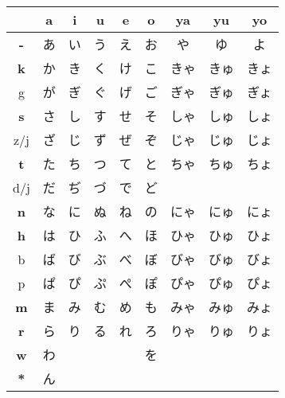 

\begin{center}

\begin{tabular}{c||c|c|c|c|c||c|c|c|}
&
\textbf{\large a}&
\textbf{\large i}&
\textbf{\large u}&
\textbf{\large e}&
\textbf{\large o}&
\textbf{\small ya}&
\textbf{\small yu}&
\textbf{\small yo}\\
\hline 
\hline 
\textbf{\large -}&あ
&い
&う
&え
&お
&や
&ゆ
&よ
\\
\hline 
\textbf{\large k}&か
&き
&く
&け
&こ
&きゃ
&きゅ
&きょ
\\
{\small g}&が
&ぎ
&ぐ
&げ
&ご
&ぎゃ
&ぎゅ
&ぎょ
\\
\hline 
\textbf{\large s}&さ
&し
&す
&せ
&そ
&しゃ
&しゅ
&しょ
\\
{\small z/j}&ざ
&じ
&ず
&ぜ
&ぞ
&じゃ
&じゅ
&じょ
\\
\hline 
\textbf{\large t}&た
&ち
&つ
&て
&と
&ちゃ
&ちゅ
&ちょ
\\
{\small d/j}&だ
&ぢ
&づ
&で
&ど
&
&
&
\\
\hline 
\textbf{\large n}&な
&に
&ぬ
&ね
&の
&にゃ
&にゅ
&にょ
\\
\hline 
\textbf{\large h}&は
&ひ
&ふ
&へ
&ほ
&ひゃ
&ひゅ
&ひょ
\\
{\small b}&ば
&び
&ぶ
&べ
&ぼ
&びゃ
&びゅ
&びょ
\\
{\small p}&ぱ
&ぴ
&ぷ
&ぺ
&ぽ
&ぴゃ
&ぴゅ
&ぴょ
\\
\hline 
\textbf{\large m}&ま
&み
&む
&め
&も
&みゃ
&みゅ
&みょ
\\
\hline 
\textbf{\large r}&ら
&り
&る
&れ
&ろ
&りゃ
&りゅ
&りょ
\\
\hline 
\textbf{\large w}&わ
&
&
&
&を
&
&
&
\\
\hline 
\textbf{\large {*}}&ん
&
&
&
&
&
&
&
\\
\hline 
\end{tabular}
\end{center}
